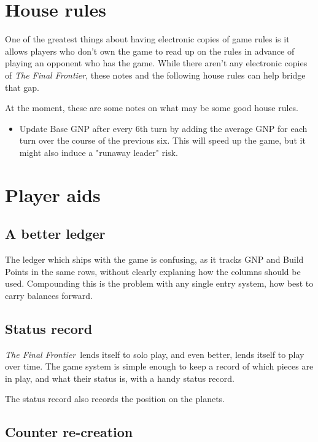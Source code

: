 \documentclass[10pt]{article}
\def\tff{{\em The Final Frontier}}
\begin{document}
\appendix

\section{House rules}

One of the greatest things about having electronic copies of game rules
is it allows players who don't own the game to read up on the rules in
advance of playing an opponent who has the game. While there aren't any
electronic copies of \tff, these notes and the following house rules can
help bridge that gap.

At the moment, these are some notes on what may be some good house rules.

\begin{itemize}
  \item Update Base GNP after every 6th turn by adding the average GNP
    for each turn over the course of the previous six. This will speed up
    the game, but it might also induce a "runaway leader" risk.
\end{itemize}

\section{Player aids}

\subsection{A better ledger}

The ledger which ships with the game is confusing, as it tracks GNP and
Build Points in the same rows, without clearly explaning how the columns
should be used. Compounding this is the problem with any single entry system,
how best to carry balances forward.

\subsection{Status record}

\tff\ lends itself to solo play, and even better, lends itself
to play over time. The game system is simple enough to keep a record of
which pieces are in play, and what their status is, with a handy status
record.

The status record also records the position on the planets.

\subsection{Counter re-creation}
\end{document}
